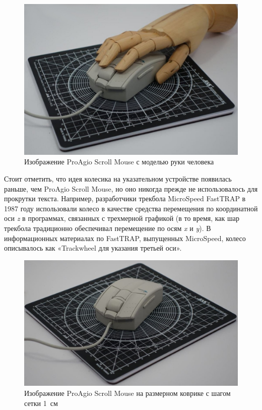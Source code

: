 \documentclass[11pt, a4paper]{article}
\begin{document}
\begin{figure}[h]
    \centering
    \includegraphics[scale=0.3]{1995_pro_agio_scroll_mouse/4.2.jpg}
    \caption{Изображение ProAgio Scroll Mouse с моделью руки человека}
    \label{fig:ScrollHand}
    \end{figure}

Стоит отметить, что идея колесика на указательном устройстве появилась раньше, чем ProAgio Scroll Mouse, но оно никогда прежде не использовалось для прокрутки текста. Например, разработчики трекбола MicroSpeed FastTRAP в 1987 году использовали колесо в качестве средства перемещения по координатной оси \textit{z} в программах, связанных с трехмерной графикой (в то время, как шар трекбола традиционно обеспечивал перемещение по осям \textit{x} и \textit{y}). В информационных материалах по FastTRAP, выпущенных MicroSpeed, колесо описывалось как «Trackwheel для указания третьей оси».

\begin{figure}[h]
    \centering
    \includegraphics[scale=0.37]{1995_pro_agio_scroll_mouse/4.3.jpg}
    \caption{Изображение ProAgio Scroll Mouse на размерном коврике с шагом сетки 1~см}
    \label{fig:ScrollSize}
\end{figure}
\end{document}
